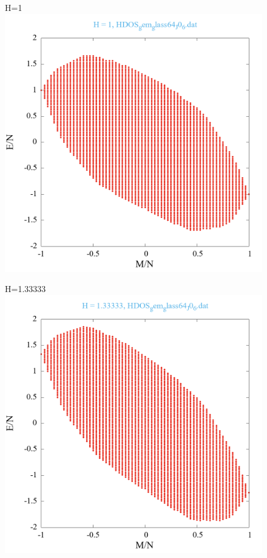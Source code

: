 \documentclass[utf8, babel, sor, jor, amsmath, amssymb, reprint]{elsarticle} %
\begin{document}
\begin{figure}[H]
\begin{minipage}[h]{0.45\linewidth}
	\end{minipage}
	\vfill
	\begin{minipage}[h]{0.45\linewidth}
		\centering H=1
		\includegraphics[width=1\linewidth]{pictures/HDOS_gem_glass64_J0_6.dat_H1.png}
	\end{minipage}
	\hfill
	\begin{minipage}[h]{0.45\linewidth}
		\centering H=1.33333
		\includegraphics[width=1\linewidth]{pictures/HDOS_gem_glass64_J0_6.dat_H1.33333.png}

\end{minipage}
\end{figure}
\end{document}
